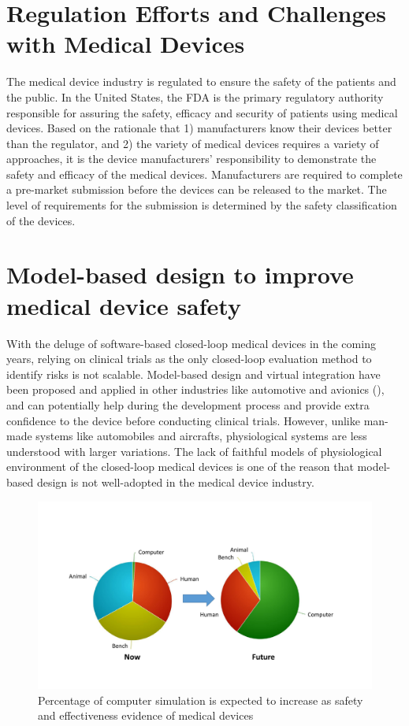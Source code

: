 \documentclass[a4paper]{article}
\begin{document}
\section{Regulation Efforts and Challenges with Medical Devices}
The medical device industry is regulated to ensure the safety of the patients and the public. In the United States, the FDA is the primary regulatory authority responsible for assuring the safety, efficacy and security of patients using medical devices. Based on the rationale that 1) manufacturers know their devices better than the regulator, and 2) the variety of medical devices requires a variety of approaches, it is the device manufacturers' responsibility to demonstrate the safety and efficacy of the medical devices. Manufacturers are required to complete a pre-market submission before the devices can be released to the market. The level of requirements for the submission is determined by the safety classification of the devices. 
\section{Model-based design to improve medical device safety}
With the deluge of software-based closed-loop medical devices in the coming years, relying on clinical trials as the only closed-loop evaluation method to identify risks is not scalable. Model-based design and virtual integration have been proposed and applied in other industries like automotive and avionics (\cite{autosar, avsi}), and can potentially help during the development process and provide extra confidence to the device before conducting clinical trials. However, unlike man-made systems like automobiles and aircrafts, physiological systems are less understood with larger variations. The lack of faithful models of physiological environment of the closed-loop medical devices is one of the reason that model-based design is not well-adopted in the medical device industry. 
\begin{figure}[t]
		\centering
		\includegraphics[width=\textwidth]{figs/MDIC.pdf}
		\caption{\small Percentage of computer simulation is expected to increase as safety and effectiveness evidence of medical devices}
		\label{fig:MDIC}
\end{figure}
\end{document}
